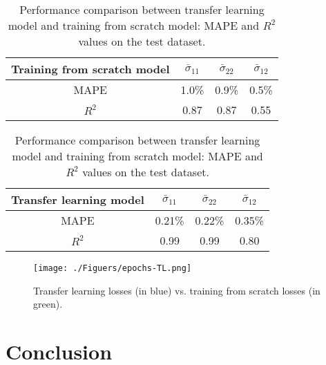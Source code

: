 \documentclass[final,3p,times]{elsarticle}
\begin{document}
\begin{table}[t]
\centering
	\begin{tabular}{||c c c c ||} 
		\hline
		Training from scratch model & $\bar{\sigma}_{11}$ & $\bar{\sigma}_{22}$& $\bar{\sigma}_{12}$  \\ [0.5ex] 
		\hline\hline
		MAPE & 1.0\% & 0.9\% & 0.5\%  \\ 
		\hline
		$R^2$& 0.87 &0.87  &0.55 \\
		\hline
	\end{tabular}
	
\bigskip

	\begin{tabular}{||c c c c ||} 
		\hline
		Transfer learning model & $\bar{\sigma}_{11}$ & $\bar{\sigma}_{22}$& $\bar{\sigma}_{12}$  \\ [0.5ex] 
		\hline\hline
		MAPE & 0.21\% & 0.22\% &0.35\%  \\ 
		\hline
		$R^2$& 0.99 &0.99  &0.80 \\
		\hline
	\end{tabular}
	
	
	\caption{Performance comparison between transfer learning model and training from scratch model: MAPE and $R^2$ values on the test dataset.}
	\label{table:Transfer-learning}
\end{table}
%
\begin{figure}[t]
	\centering 
	\texttt{[image: ./Figuers/epochs-TL.png]} 
			\caption{Transfer learning losses (in blue) vs. training from scratch losses (in green).}
	\label{example2-2}
\end{figure}


\section{Conclusion}
\label{sec6-CNN}
\end{document}
